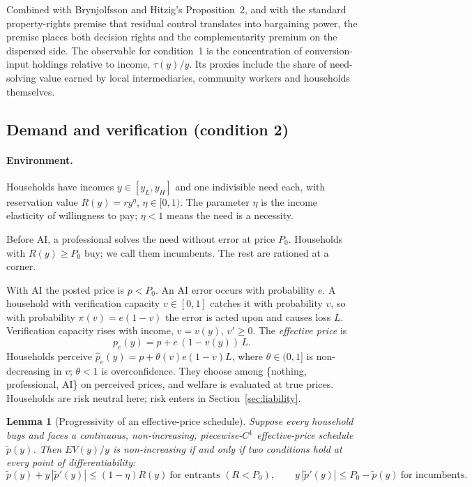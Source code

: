 \documentclass[12pt]{article}
\newtheorem{lemma}{Lemma}
\theoremstyle{remark}
\begin{document}
Combined with Brynjolfsson and Hitzig's Proposition~2, and with the standard property-rights premise that residual control translates into bargaining power, the premise places both decision rights and the complementarity premium on the dispersed side. The observable for condition~1 is the concentration of conversion-input holdings relative to income, $\tau(y)/y$. Its proxies include the share of need-solving value earned by local intermediaries, community workers and households themselves.

\subsection{Demand and verification (condition 2)}\label{sec:verification}

\paragraph{Environment.} Households have incomes $y\in[y_L,y_H]$ and one indivisible need each, with reservation value $R(y)=ry^\eta$, $\eta\in[0,1)$. The parameter $\eta$ is the income elasticity of willingness to pay; $\eta<1$ means the need is a necessity.

Before AI, a professional solves the need without error at price $P_0$. Households with $R(y)\ge P_0$ buy; we call them incumbents. The rest are rationed at a corner.

With AI the posted price is $p<P_0$. An AI error occurs with probability $e$. A household with verification capacity $v\in[0,1]$ catches it with probability $v$, so with probability $\pi(v)=e(1-v)$ the error is acted upon and causes loss $L$. Verification capacity rises with income, $v=v(y)$, $v'\ge0$. The \emph{effective price} is
\begin{equation}
p_e(y)=p+e\,(1-v(y))\,L .
\end{equation}
Households perceive $\hat p_e(y)=p+\theta(v)e(1-v)L$, where $\theta\in(0,1]$ is non-decreasing in $v$; $\theta<1$ is overconfidence. They choose among \{nothing, professional, AI\} on perceived prices, and welfare is evaluated at true prices. Households are risk neutral here; risk enters in Section~\ref{sec:liability}.

\begin{lemma}[Progressivity of an effective-price schedule]\label{lem:schedule}
Suppose every household buys and faces a continuous, non-increasing, piecewise-$C^1$ effective-price schedule $\tilde p(y)$. Then $EV(y)/y$ is non-increasing if and only if two conditions hold at every point of differentiability:
\[
\tilde p(y)+y\,|\tilde p'(y)|\le(1-\eta)R(y)\ \text{for entrants }(R<P_0),\qquad y\,|\tilde p'(y)|\le P_0-\tilde p(y)\ \text{for incumbents}.
\]
\end{lemma}
\end{document}

